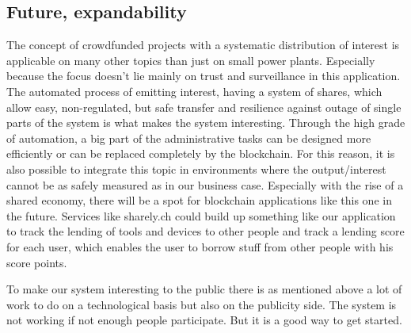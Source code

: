\subsection{Future, expandability}
The concept of crowdfunded projects with a systematic distribution of interest is applicable on many other topics than just on small power plants. Especially because the focus doesn’t lie mainly on trust and surveillance in this application. The automated process of emitting interest, having a system of shares, which allow easy, non-regulated, but safe transfer and resilience against outage of single parts of the system is what makes the system interesting. Through the high grade of automation, a big part of the administrative tasks can be designed more efficiently or can be replaced completely by the blockchain. For this reason, it is also possible to integrate this topic in environments where the output/interest cannot be as safely measured as in our business case. Especially with the rise of a shared economy, there will be a spot for blockchain applications like this one in the future. Services like sharely.ch could build up something like our application to track the lending of tools and devices to other people and track a lending score for each user, which enables the user to borrow stuff from other people with his score points.

To make our system interesting to the public there is as mentioned above a lot of work to do on a technological basis but also on the publicity side. The system is not working if not enough people participate. But it is a good way to get started.
%
%
%
%